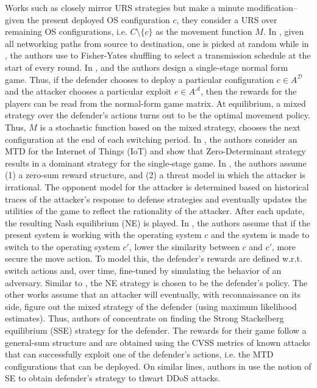 Works such as  closely mirror URS strategies but make a minute modification-- given the present deployed OS configuration $c$, they consider a URS over remaining OS configurations, i.e. $C \setminus \{c\}$ as the movement function $M$. In , given all networking paths from source to destination, one is picked at random while in , the authors use to Fisher-Yates shuffling to select a transmission schedule at the start of every round.
In , and  the authors design a single-stage normal form game. Thus, if the defender chooses to deploy a particular configuration $c \in A^\mathcal{D}$ and the attacker chooses a particular exploit $e \in A^\mathcal{A}$, then the rewards for the players can be read from the normal-form game matrix. At equilibrium, a mixed strategy over the defender's actions turns out to be the optimal movement policy. Thus, $M$ is a stochastic function based on the mixed strategy, chooses the next configuration at the end of each switching period. In , the authors consider an MTD for the Internet of Things (IoT) and show that Zero-Determinant strategy results in a dominant strategy for the single-stage game.
In , the authors assume (1) a zero-sum reward structure, and (2) a threat model in which the attacker is irrational. The opponent model for the attacker is determined based on historical traces of the attacker's response to defense strategies and eventually updates the utilities of the game to reflect the rationality of the attacker. After each update, the resulting Nash equilibrium (NE) is played. In , the authors assume that if the present system is working with the operating system $c$ and the system is made to switch to the operating system $c'$, lower the similarity between $c$ and $c'$, more secure the move action. To model this, the defender's rewards are defined w.r.t. switch actions and, over time, fine-tuned by simulating the behavior of an adversary. Similar to , the NE strategy is chosen to be the defender's policy.
The other works assume that an attacker will eventually, with reconnaissance on its side, figure out the mixed strategy of the defender (using maximum likelihood estimates). Thus, authors of  concentrate on finding the Strong Stackelberg equilibrium (SSE) strategy for the defender. The rewards for their game follow a general-sum structure and are obtained using the CVSS metrics of known attacks that can successfully exploit one of the defender's actions, i.e. the MTD configurations that can be deployed. On similar lines, authors in  use the notion of SE to obtain defender's strategy to thwart DDoS attacks.

